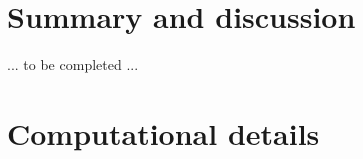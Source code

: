 \documentclass[article]{jss}
\begin{document}
% 
% 
% 
% 
% 
% 




\section{Summary and discussion} \label{sec:summary}

... to be completed ...




\section*{Computational details}

\end{document}
